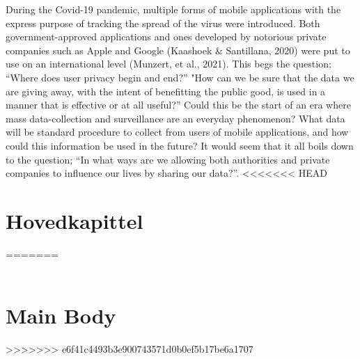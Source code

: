 \documentclass[11pt]{article}
\begin{document}
During the Covid-19 pandemic, multiple forms of mobile applications with the express purpose of tracking the spread of the virus were introduced. Both government-approved applications and ones developed by notorious private companies such as Apple and Google (Kaashoek \& Santillana, 2020) were put to use on an international level (Munzert, et al., 2021). This begs the question; “Where does user privacy begin and end?” "How can we be sure that the data we are giving away, with the intent of benefitting the public good, is used in a manner that is effective or at all useful?” Could this be the start of an era where mass data-collection and surveillance are an everyday phenomenon? What data will be standard procedure to collect from users of mobile applications, and how could this information be used in the future? It would seem that it all boils down to the question; “In what ways are we allowing both authorities and private companies to influence our lives by sharing our data?”. 
<<<<<<< HEAD
\\
\section{Hovedkapittel}
=======
\\ \\
\section{Main Body}

>>>>>>> e6f41c4493b3e900743571d0b0ef5b17be6a1707
\end{document}
